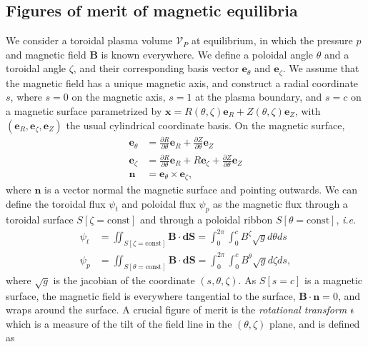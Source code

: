 \documentclass[my_thesis.tex]{subfiles}
\begin{document}
\subsection{Figures of merit of magnetic equilibria}
We consider a toroidal plasma volume $\mathcal{V}_P$ at equilibrium, in which the pressure $p$ and magnetic field $\mathbf{B}$ is known everywhere. We define a poloidal angle $\theta$ and a toroidal angle $\zeta$, and their corresponding basis vector $\mathbf{e}_\theta$ and $\mathbf{e}_\zeta$. We assume that the magnetic field has a unique magnetic axis, and construct a radial coordinate $s$, where $s=0$ on the magnetic axis, $s=1$ at the plasma boundary, and $s=c$ on a magnetic surface parametrized by $\mathbf{x}=R(\theta,\zeta)\mathbf{e}_R + Z(\theta,\zeta)\mathbf{e}_Z$, with $(\mathbf{e}_R,\mathbf{e}_\zeta,\mathbf{e}_Z)$ the usual cylindrical coordinate basis. On the magnetic surface, 
\begin{align}
	\mathbf{e}_\theta &= \frac{\partial R}{\partial \theta}\mathbf{e}_R + \frac{\partial Z}{\partial \theta}\mathbf{e}_Z\\
	\mathbf{e}_\zeta &= \frac{\partial R}{\partial \theta}\mathbf{e}_R + R\mathbf{e}_\zeta + \frac{\partial Z}{\partial \theta}\mathbf{e}_Z\\
	\mathbf{n} &= \mathbf{e}_\theta\times\mathbf{e}_\zeta,
\end{align}
where $\mathbf{n}$ is a vector normal the magnetic surface and pointing outwards. We can define the toroidal flux $\psi_t$ and poloidal flux $\psi_p$ as the magnetic flux through a toroidal surface $S[\zeta=\text{const}]$ and through a poloidal ribbon $S[\theta=\text{const}]$, \textit{i.e.}
\begin{align}
	\psi_t &= \iint_{S[\zeta=\text{const}]} \mathbf{B}\cdot \mathbf{dS} = \int_0^{2\pi}\int_0^c B^\zeta \sqrt{g}d\theta ds\\
	\psi_p &= \iint_{S[\theta=\text{const}]} \mathbf{B}\cdot \mathbf{dS} = \int_0^{2\pi}\int_0^c B^\theta \sqrt{g}d\zeta ds,
\end{align}
where $\sqrt{g}$ is the jacobian of the coordinate $(s,\theta,\zeta)$. As $S[s=c]$ is a magnetic surface, the magnetic field is everywhere tangential to the surface, $\mathbf{B}\cdot\mathbf{n}=0$, and wraps around the surface. A crucial figure of merit is the \emph{rotational transform} $\text{$\iota\!\!$-}$ which is a measure of the tilt of the field line in the $(\theta,\zeta)$ plane, and is defined as
\end{document}
